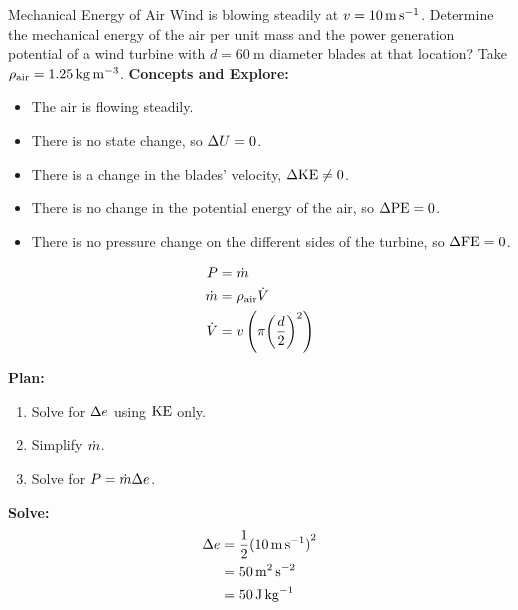 \begin{example}{Mechanical Energy of Air}
  Wind is blowing steadily at $v = \SI{10}{\meter\per\second}$.
  Determine the mechanical energy of the air per unit mass and the power generation potential of a wind turbine with $d = \SI{60}{\meter}$ diameter blades at that location?
  Take $\rho_{\mathrm{air}} = \SI{1.25}{\kilo\gram\per\meter\cubed}$.
  \tcblower{}
  \textbf{Concepts and Explore:}
  \begin{itemize}[noitemsep]
  \item The air is flowing steadily.
  \item There is no state change, so $\Delta U = 0$.
  \item There is a change in the blades' velocity, $\Delta \textrm{KE} \neq 0$.
  \item There is no change in the potential energy of the air, so $\Delta \textrm{PE} = 0$.
  \item There is no pressure change on the different sides of the turbine, so $\Delta \textrm{FE} = 0$.
  \end{itemize}

  \begin{align*}
    P &= \dot{m} \\
    \dot{m} &= \rho_{\mathrm{air}} \dot{V} \\
    \dot{V} &= v \left( \pi {\left( \frac{d}{2} \right)}^{2} \right)
  \end{align*}

  \textbf{Plan:}
  \begin{enumerate}[noitemsep]
  \item Solve for $\Delta e$ using $\textrm{KE}$ only.
  \item Simplify $\dot{m}$.
  \item Solve for $P = \dot{m} \Delta e$.
  \end{enumerate}

  \textbf{Solve:}
  \begin{align*}
    \Delta e &= \frac{1}{2} {(\SI{10}{\meter\per\second})}^{2} \\
                             &= \SI{50}{\meter\squared\per\second\squared} \\
                             &= \SI{50}{\joule\per\kilo\gram}
  \end{align*}


\end{example}
